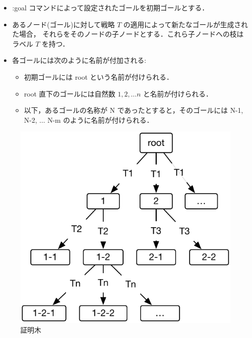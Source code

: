 \documentclass[a4paper,oneside,10pt,here]{memoir}
\begin{document}
\begin{itemize}
\item :goal コマンドによって設定されたゴールを初期ゴールとする．
\item あるノード(ゴール)に対して戦略 $T$ の適用によって新たなゴールが生成された場合，
  それらをそのノードの子ノードとする．これら子ノードへの枝はラベル $T$ を持つ．
\item 各ゴールには次のように名前が付加される:
  \begin{itemize}
    \item 初期ゴールには root という名前が付けられる．
    \item root 直下のゴールには自然数 $1, 2, \ldots n$ と名前が付けられる．
    \item 以下，あるゴールの名称が N であったとすると，そのゴールには
      N-1, N-2, $\ldots$ N-m のように名前が付けられる．
  \end{itemize}
\end{itemize}
\begin{figure}[hbt]
  \centering
\includegraphics[scale=1.0]{proof-tree.pdf}  
  \caption{証明木}
  \label{fig:proof-tree}
\end{figure}
\end{document}
